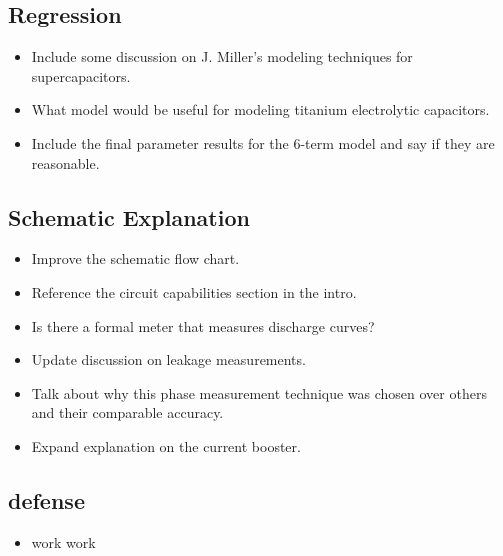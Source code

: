 \documentclass{article}
\begin{document}
\subsection{Regression}
\begin{itemize}
    \item Include some discussion on J. Miller's modeling techniques for supercapacitors.
    \item What model would be useful for modeling titanium electrolytic capacitors.
    \item Include the final parameter results for the 6-term model and say if they are reasonable.
\end{itemize}

\subsection{Schematic Explanation}
\begin{itemize}
    \item Improve the schematic flow chart.
    \item Reference the circuit capabilities section in the intro.
    \item Is there a formal meter that measures discharge curves?
    \item Update discussion on leakage measurements.
    \item Talk about why this phase measurement technique was chosen over others and their comparable accuracy.
    \item Expand explanation on the current booster.
\end{itemize}

\subsection{defense}
\begin{itemize}
    \item work work
\end{itemize}


\end{document}
